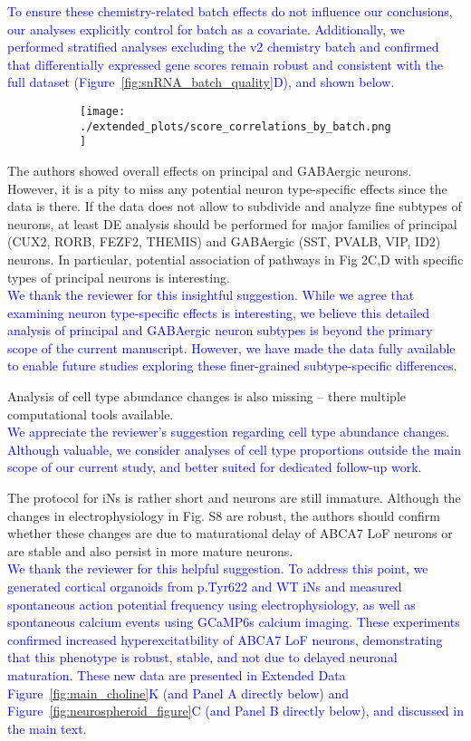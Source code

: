 \textcolor{blue}{To ensure these chemistry-related batch effects do not influence our conclusions, our analyses explicitly control for batch as a covariate. Additionally, we performed stratified analyses excluding the v2 chemistry batch and confirmed that differentially expressed gene scores remain robust and consistent with the full dataset (Figure~\ref{fig:snRNA_batch_quality}D), and shown below.}

\begin{figure}[H]
	\begin{subfigure}[t]{\textwidth}
	\texttt{[image: ./extended\_plots/score\_correlations\_by\_batch.png]}        
	\end{subfigure}   
\end{figure}

The authors showed overall effects on principal and GABAergic neurons. However, it is a pity to miss any potential neuron type-specific effects since the data is there. If the data does not allow to subdivide and analyze fine subtypes of neurons, at least DE analysis should be performed for major families of principal (CUX2, RORB, FEZF2, THEMIS) and GABAergic (SST, PVALB, VIP, ID2) neurons. In particular, potential association of pathways in Fig 2C,D with specific types of principal neurons is interesting.\\
\textcolor{blue}{We thank the reviewer for this insightful suggestion. While we agree that examining neuron type-specific effects is interesting, we believe this detailed analysis of principal and GABAergic neuron subtypes is beyond the primary scope of the current manuscript. However, we have made the data fully available to enable future studies exploring these finer-grained subtype-specific differences.}

Analysis of cell type abundance changes is also missing – there multiple computational tools available.\\
\textcolor{blue}{We appreciate the reviewer’s suggestion regarding cell type abundance changes. Although valuable, we consider analyses of cell type proportions outside the main scope of our current study, and better suited for dedicated follow-up work.}

The protocol for iNs is rather short and neurons are still immature. Although the changes in electrophysiology in Fig. S8 are robust, the authors should confirm whether these changes are due to maturational delay of ABCA7 LoF neurons or are stable and also persist in more mature neurons.\\
\textcolor{blue}{We thank the reviewer for this helpful suggestion. To address this point, we generated cortical organoids from p.Tyr622 and WT iNs and measured spontaneous action potential frequency using electrophysiology, as well as spontaneous calcium events using GCaMP6s calcium imaging. These experiments confirmed increased hyperexcitatbility of ABCA7 LoF neurons, demonstrating that this phenotype is robust, stable, and not due to delayed neuronal maturation. These new data are presented in Extended Data Figure~\ref{fig:main_choline}K (and Panel A directly below) and Figure~\ref{fig:neurospheroid_figure}C (and Panel B directly below), and discussed in the main text.}

